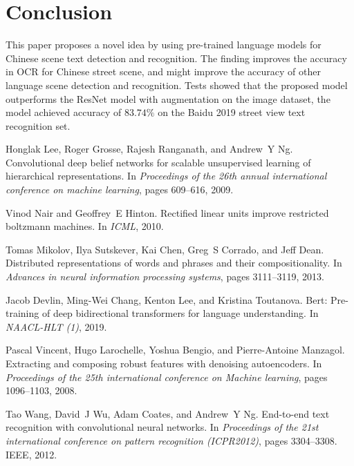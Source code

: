 \documentclass[10pt,twocolumn,letterpaper]{article}
\begin{document}
\section{Conclusion}

This paper proposes a novel idea by using pre-trained language models for Chinese scene text detection and recognition.
The finding improves the accuracy in OCR for Chinese street scene, and might improve the accuracy of other language scene detection and recognition.
Tests showed that the proposed model outperforms the ResNet model with augmentation on the image dataset,
the model achieved accuracy of $83.74\%$ on the Baidu 2019 street view text recognition set.


{\small

%
\begin{thebibliography}{10}

Honglak Lee, Roger Grosse, Rajesh Ranganath, and Andrew~Y Ng.
\newblock Convolutional deep belief networks for scalable unsupervised learning
  of hierarchical representations.
\newblock In {\em Proceedings of the 26th annual international conference on
  machine learning}, pages 609--616, 2009.


Vinod Nair and Geoffrey~E Hinton.
\newblock Rectified linear units improve restricted boltzmann machines.
\newblock In {\em ICML}, 2010.


Tomas Mikolov, Ilya Sutskever, Kai Chen, Greg~S Corrado, and Jeff Dean.
\newblock Distributed representations of words and phrases and their
  compositionality.
\newblock In {\em Advances in neural information processing systems}, pages
  3111--3119, 2013.


Jacob Devlin, Ming-Wei Chang, Kenton Lee, and Kristina Toutanova.
\newblock Bert: Pre-training of deep bidirectional transformers for language
  understanding.
\newblock In {\em NAACL-HLT (1)}, 2019.


Pascal Vincent, Hugo Larochelle, Yoshua Bengio, and Pierre-Antoine Manzagol.
\newblock Extracting and composing robust features with denoising autoencoders.
\newblock In {\em Proceedings of the 25th international conference on Machine
  learning}, pages 1096--1103, 2008.


Tao Wang, David~J Wu, Adam Coates, and Andrew~Y Ng.
\newblock End-to-end text recognition with convolutional neural networks.
\newblock In {\em Proceedings of the 21st international conference on pattern
  recognition (ICPR2012)}, pages 3304--3308. IEEE, 2012.



\end{thebibliography}}
\end{document}
